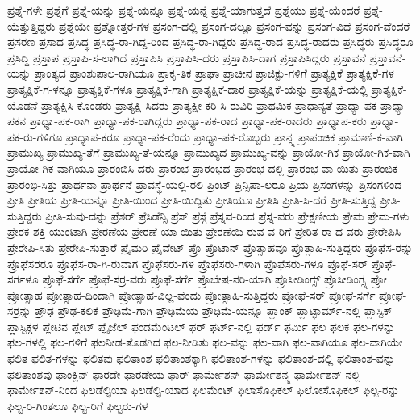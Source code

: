 {ಪ್ರಶ್ನೆ-ಗಳೇ
ಪ್ರಶ್ನೆಗೆ
ಪ್ರಶ್ನೆ-ಯನ್ನು
ಪ್ರಶ್ನೆ-ಯನ್ನೂ
ಪ್ರಶ್ನೆ-ಯನ್ನೆ
ಪ್ರಶ್ನೆ-ಯಾಗುತ್ತದೆ
ಪ್ರಶ್ನೆಯು
ಪ್ರಶ್ನೆ-ಯೆಂದರೆ
ಪ್ರಶ್ನೆ-ಯೆತ್ತುತ್ತಿದ್ದರು
ಪ್ರಶ್ನೆಯೇ
ಪ್ರಶ್ನೋತ್ತರ-ಗಳ
ಪ್ರಸಂಗ-ದಲ್ಲಿ
ಪ್ರಸಂಗ-ದಲ್ಲೂ
ಪ್ರಸಂಗ-ವನ್ನು
ಪ್ರಸಂಗ-ವಿದೆ
ಪ್ರಸಂಗ-ವೆಂದರೆ
ಪ್ರಸರಣ
ಪ್ರಸಾದ
ಪ್ರಸಿದ್ಧ
ಪ್ರಸಿದ್ಧ-ರಾ-ಗಿದ್ದ-ರಿಂದ
ಪ್ರಸಿದ್ಧ-ರಾ-ಗಿದ್ದರು
ಪ್ರಸಿದ್ಧ-ರಾದ
ಪ್ರಸಿದ್ಧ-ರಾದರು
ಪ್ರಸಿದ್ಧರು
ಪ್ರಸಿದ್ಧರೂ
ಪ್ರಸಿದ್ಧಿ
ಪ್ರಸ್ತಾಪ
ಪ್ರಸ್ತಾಪಿ-ಸ-ಲಾಗಿದೆ
ಪ್ರಸ್ತಾಪಿಸಿ
ಪ್ರಸ್ತಾಪಿಸಿ-ದರು
ಪ್ರಸ್ತಾಪಿಸಿ-ದಾಗ
ಪ್ರಸ್ತಾಪಿಸಿದ್ದರು
ಪ್ರಸ್ತಾವನೆ
ಪ್ರಸ್ತಾವನೆ-ಯನ್ನು
ಪ್ರಾಂತ್ಯದ
ಪ್ರಾಂಶುಪಾಲ-ರಾಗಿಯೂ
ಪ್ರಾಕೃ-ತಿಕ
ಪ್ರಾಘಾ
ಪ್ರಾಚೀನ
ಪ್ರಾಜಿಕ್ಟು-ಗಳಿಗೆ
ಪ್ರಾತ್ಯಕ್ಷಿಕೆ
ಪ್ರಾತ್ಯಕ್ಷಿಕೆ-ಗಳ
ಪ್ರಾತ್ಯಕ್ಷಿಕೆ-ಗ-ಳನ್ನೂ
ಪ್ರಾತ್ಯಕ್ಷಿಕೆ-ಗಳೂ
ಪ್ರಾತ್ಯಕ್ಷಿಕೆ-ಗಾಗಿ
ಪ್ರಾತ್ಯಕ್ಷಿಕೆ-ದಾರ
ಪ್ರಾತ್ಯಕ್ಷಿಕೆ-ಯನ್ನು
ಪ್ರಾತ್ಯಕ್ಷಿಕೆ-ಯಲ್ಲಿ
ಪ್ರಾತ್ಯಕ್ಷಿಕೆ-ಯೊಡನೆ
ಪ್ರಾತ್ಯಕ್ಷಿಸಿ-ಕೊಂಡರು
ಪ್ರಾತ್ಯಕ್ಷಿ-ಸಿದರು
ಪ್ರಾತ್ಯಕ್ಷೀ-ಕರಿ-ಸಿ-ರುವಿರಿ
ಪ್ರಾಥಮಿಕ
ಪ್ರಾಧಾನ್ಯತೆ
ಪ್ರಾಧ್ಯಾ-ಪಕ
ಪ್ರಾಧ್ಯಾ-ಪಕನ
ಪ್ರಾಧ್ಯಾ-ಪಕ-ರಾಗಿ
ಪ್ರಾಧ್ಯಾ-ಪಕ-ರಾಗಿದ್ದರು
ಪ್ರಾಧ್ಯಾ-ಪಕ-ರಾದ
ಪ್ರಾಧ್ಯಾ-ಪಕ-ರಾದರು
ಪ್ರಾಧ್ಯಾಪ-ಕರು
ಪ್ರಾಧ್ಯಾ-ಪಕ-ರು-ಗಳಿಗೂ
ಪ್ರಾಧ್ಯಾಪ-ಕರೂ
ಪ್ರಾಧ್ಯಾ-ಪಕ-ರೆಂದು
ಪ್ರಾಧ್ಯಾ-ಪಕ-ರೊಬ್ಬರು
ಪ್ರಾನ್ಸ್ನ
ಪ್ರಾಪಂಚಿಕ
ಪ್ರಾಮಾಣಿ-ಕ-ವಾಗಿ
ಪ್ರಾಮುಖ್ಯ
ಪ್ರಾಮುಖ್ಯ-ತೆಗೆ
ಪ್ರಾಮುಖ್ಯ-ತೆ-ಯನ್ನೂ
ಪ್ರಾಮುಖ್ಯದ
ಪ್ರಾಮುಖ್ಯ-ವನ್ನು
ಪ್ರಾಯೋ-ಗಿಕ
ಪ್ರಾಯೋ-ಗಿಕ-ವಾಗಿ
ಪ್ರಾಯೋ-ಗಿಕ-ವಾಗಿಯೂ
ಪ್ರಾರಂಬಿಸಿ-ದರು
ಪ್ರಾರಂಭ
ಪ್ರಾರಂಭದ
ಪ್ರಾರಂಭ-ದಲ್ಲಿ
ಪ್ರಾರಂಭ-ವಾ-ಯಿತು
ಪ್ರಾರಂಭಿಕ
ಪ್ರಾರಂಭಿ-ಸಿತ್ತು
ಪ್ರಾರ್ಥನಾ
ಪ್ರಾರ್ಥನೆ
ಪ್ರಾವಸ್ಥೆ-ಯಲ್ಲಿ-ರಲಿ
ಪ್ರಿಂಟ್
ಪ್ರಿನ್ಸಿಪಾ-ಲರೂ
ಪ್ರಿಯ
ಪ್ರಿಸಂಗಳನ್ನು
ಪ್ರಿಸಂಗಳಿಂದ
ಪ್ರೀತಿ
ಪ್ರೀತಿಯ
ಪ್ರೀತಿ-ಯನ್ನೂ
ಪ್ರೀತಿ-ಯಿಂದ
ಪ್ರೀತಿ-ಯಿದ್ದಿತು
ಪ್ರೀತಿಯೂ
ಪ್ರೀತಿಸಿ
ಪ್ರೀತಿ-ಸಿ-ದರೆ
ಪ್ರೀತಿ-ಸುತ್ತಿದ್ದ
ಪ್ರೀತಿ-ಸುತ್ತಿದ್ದರು
ಪ್ರೀತಿ-ಸುವು-ದನ್ನು
ಪ್ರೆಶರ್
ಪ್ರೆಸಿಡೆನ್ಸಿ
ಪ್ರೆಸ್
ಪ್ರೆಸ್ಗೆ
ಪ್ರೆಸ್ನವ-ರಿಂದ
ಪ್ರೆಸ್ನ-ವರು
ಪ್ರೇಕ್ಷಣೀಯ
ಪ್ರೇಮ
ಪ್ರೇಮ-ಗಳು
ಪ್ರೇರಕ-ಶಕ್ತಿ-ಯುಂಟಾಗಿ
ಪ್ರೇರಣೆಯ
ಪ್ರೇರಣೆ-ಯಾ-ಯಿತು
ಪ್ರೇರಣೆಯಿ-ರುವ-ವ-ರಿಗೆ
ಪ್ರೇರಿತ-ರಾ-ದ-ವರು
ಪ್ರೇರೇಪಿಸಿ
ಪ್ರೇರೇಪಿ-ಸಿತು
ಪ್ರೇರೇಪಿ-ಸುತ್ತಾರೆ
ಪ್ರೈಮರಿ
ಪ್ರೈವೇಟ್
ಪ್ರೊ
ಪ್ರೊಟಾನ್
ಪ್ರೊತ್ಸಾಹವೂ
ಪ್ರೊತ್ಸಾಹಿ-ಸುತ್ತಿದ್ದರು
ಪ್ರೊಫೆಸ-ರನ್ನು
ಪ್ರೊಫೆಸರರೂ
ಪ್ರೊಫೆಸ-ರಾ-ಗಿ-ರುವಾಗ
ಪ್ರೊಫೆಸರು-ಗಳ
ಪ್ರೊಫೆಸರು-ಗಳಾಗಿ
ಪ್ರೊಫೆಸರು-ಗಳೂ
ಪ್ರೊಫೆ-ಸರ್
ಪ್ರೊಫೆ-ಸರ್ಗಳೂ
ಪ್ರೊಫೆ-ಸರ್ಗೆ
ಪ್ರೊಫೆ-ಸರ್ರ-ವರು
ಪ್ರೊಫೆ-ಸರ್ಗೆ
ಪ್ರೊಬೇಷ-ನರಿ-ಯಾಗಿ
ಪ್ರೊಸೀಡಿಂಗ್ಸ್
ಪ್ರೊಸೀಡಿಂಗ್ಸ್ನ
ಪ್ರೋ
ಪ್ರೋತ್ಸಾಹ
ಪ್ರೋತ್ಸಾಹ-ದಿಂದಾಗಿ
ಪ್ರೋತ್ಸಾಹ-ವಿಲ್ಲ-ವೆಂದು
ಪ್ರೋತ್ಸಾಹಿ-ಸುತ್ತಿದ್ದರು
ಪ್ರೋಫೆ-ಸರ್
ಪ್ರೋಫೆ-ಸರ್ಗೆ
ಪ್ರೋಫೆ-ಸರ್ರನ್ನು
ಪ್ರೌಢ
ಪ್ರೌಢ-ಕಲಿಕೆ
ಪ್ರೌಢಿಮೆ-ಗಾಗಿ
ಪ್ರೌಢಿಮೆಯ
ಪ್ರೌಢಿಮೆ-ಯನ್ನೂ
ಪ್ಲಾಂಕ್
ಪ್ಲಾಟ್ಫಾರ್ಮ್-ನಲ್ಲಿ
ಪ್ಲಾಸ್ಟಿಕ್
ಪ್ಲಾಸ್ಟಿಕ್ಗಳ
ಪ್ಲೇಟಿನ
ಪ್ಲೇಟ್
ಪ್ಲೈಜೆಲ್
ಫಂಡಮೆಂಟಲ್
ಫರ್
ಫರ್ಟ್-ನಲ್ಲಿ
ಫರ್ಡ್
ಫರ್ಮಿ
ಫಲ
ಫಲಕ
ಫಲ-ಗಳನ್ನು
ಫಲ-ಗಳಲ್ಲಿ
ಫಲ-ಗಳಿಗೆ
ಫಲನೀಡ-ತೊಡಗಿದ
ಫಲ-ನೀಡಿತು
ಫಲ-ವನ್ನು
ಫಲ-ವಾಗಿ
ಫಲ-ವಾಗಿಯೂ
ಫಲ-ವಾಗಿಯೇ
ಫಲಿತ
ಫಲಿತ-ಗಳನ್ನು
ಫಲಿತವು
ಫಲಿತಾಂಶ
ಫಲಿತಾಂಶಕ್ಕಾಗಿ
ಫಲಿತಾಂಶ-ಗಳನ್ನು
ಫಲಿತಾಂಶ-ದಲ್ಲಿ
ಫಲಿತಾಂಶ-ವನ್ನು
ಫಲಿತಾಂಶವು
ಫಾಂಕ್ಲಿನ್
ಫಾರಡೇ
ಫಾರಡೇಯ
ಫಾರ್
ಫಾರ್ಮೇಶನ್
ಫಾರ್ಮೇಶನ್ಸ್ನ
ಫಾರ್ಮೇಶನ್-ನಲ್ಲಿ
ಫಾರ್ಮೇಶನ್-ನಿಂದ
ಫಿಲಡೆಲ್ಫಿಯಾ
ಫಿಲಡೆಲ್ಫಿ-ಯಾದ
ಫಿಲಮೆಂಟ್
ಫಿಲಾಸೊಫಿಕಲ್
ಫಿಲೋಸೊಫಿಕಲ್
ಫಿಲ್ಟ-ರನ್ನು
ಫಿಲ್ಟ-ರಿ-ಗಿಂತಲೂ
ಫಿಲ್ಟ-ರಿಗೆ
ಫಿಲ್ಟರು-ಗಳ
}
